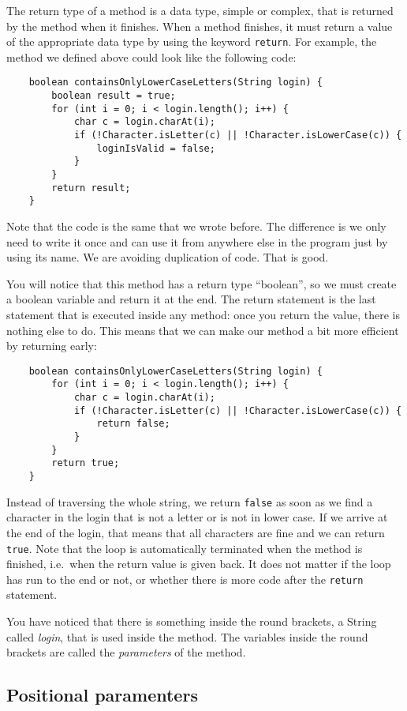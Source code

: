 The return type of a method is a data type, simple or complex, that is
returned by the method when it finishes. When a method finishes, it
must return a value of the appropriate data type by using the keyword
\verb+return+. For example, the method we defined above could look
like the following code:

\begin{verbatim}
    boolean containsOnlyLowerCaseLetters(String login) {
        boolean result = true;
        for (int i = 0; i < login.length(); i++) {
            char c = login.charAt(i);
            if (!Character.isLetter(c) || !Character.isLowerCase(c)) {
                loginIsValid = false;
            }
        }
        return result;
    }
\end{verbatim}

Note that the code is the same that we wrote before. The difference is
we only need to write it once and can use it from anywhere else in the
program just by using its name. We are avoiding duplication of
code. That is good. 

You will notice that this method has a return type ``boolean'', so we
must create a boolean variable and return it at the end. The return
statement is the last statement that is executed inside any method:
once you return the value, there is nothing else to do. This means
that we can make our method a bit more efficient by returning early: 

\begin{verbatim}
    boolean containsOnlyLowerCaseLetters(String login) {
        for (int i = 0; i < login.length(); i++) {
            char c = login.charAt(i);
            if (!Character.isLetter(c) || !Character.isLowerCase(c)) {
                return false;
            }
        }
        return true;
    }
\end{verbatim}

Instead of traversing the whole string, we return \verb+false+ as soon
as we find a character in the login that is not a letter or is not
in lower case. If we arrive at the end of the login, that means that
all characters are fine and we can return \verb+true+. Note that the
loop is automatically terminated when the method is finished,
i.e.~when the return value is given back. It does not matter if the
loop has run to the end or not, or whether there is more code after
the \verb+return+ statement. 

You have noticed that there is something inside the round brackets, a
String called \emph{login}, that is used inside the method. The
variables inside the round brackets are called the \emph{parameters} of the
method. 

\subsection{Positional paramenters}
\label{sec:pospar}









